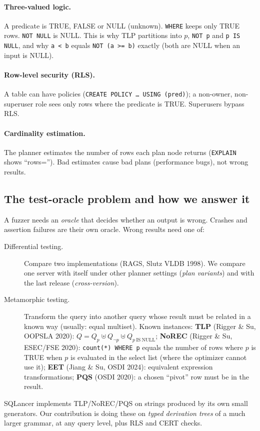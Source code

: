 \paragraph{Three-valued logic.} A predicate is TRUE, FALSE or NULL (unknown).
\texttt{WHERE} keeps only TRUE rows. \texttt{NOT NULL} is NULL. This is why
TLP partitions into $p$, \texttt{NOT p} and \texttt{p IS NULL}, and why
\texttt{a < b} equals \texttt{NOT (a >= b)} exactly (both are NULL when an
input is NULL).

\paragraph{Row-level security (RLS).} A table can have policies
(\texttt{CREATE POLICY \dots{} USING (pred)}); a non-owner, non-superuser role
sees only rows where the predicate is TRUE. Superusers bypass RLS.

\paragraph{Cardinality estimation.} The planner estimates the number of rows
each plan node returns (\texttt{EXPLAIN} shows ``rows=''). Bad estimates cause
bad plans (performance bugs), not wrong results.

\subsection{The test-oracle problem and how we answer it}

A fuzzer needs an \emph{oracle} that decides whether an output is wrong. Crashes
and assertion failures are their own oracle. Wrong results need one of:
\begin{description}
  \item[Differential testing.] Compare two implementations (RAGS, Slutz VLDB
    1998). We compare one server with itself under other planner settings
    (\emph{plan variants}) and with the last release (\emph{cross-version}).
  \item[Metamorphic testing.] Transform the query into another query whose
    result must be related in a known way (usually: equal multiset). Known
    instances: \textbf{TLP} (Rigger \& Su, OOPSLA 2020):
    $Q = Q_{p} \uplus Q_{\neg p} \uplus Q_{p\ \mathrm{IS\ NULL}}$;
    \textbf{NoREC} (Rigger \& Su, ESEC/FSE 2020): \texttt{count(*) WHERE p}
    equals the number of rows where $p$ is TRUE when $p$ is evaluated in the
    select list (where the optimizer cannot use it);
    \textbf{EET} (Jiang \& Su, OSDI 2024): equivalent expression
    transformations; \textbf{PQS} (OSDI 2020): a chosen ``pivot'' row must be in
    the result.
\end{description}
SQLancer implements TLP/NoREC/PQS on strings produced by its own small
generators. Our contribution is doing these on \emph{typed derivation trees}
of a much larger grammar, at any query level, plus RLS and CERT checks.


